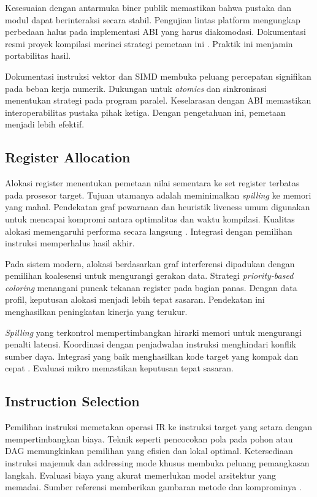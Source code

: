 \documentclass[../main.tex]{subfiles}
\begin{document}
Kesesuaian dengan antarmuka biner publik memastikan bahwa pustaka dan modul dapat berinteraksi secara stabil. Pengujian lintas platform mengungkap perbedaan halus pada implementasi ABI yang harus diakomodasi. Dokumentasi resmi proyek kompilasi merinci strategi pemetaan ini \citep{GCCInternals}. Praktik ini menjamin portabilitas hasil.

Dokumentasi instruksi vektor dan SIMD membuka peluang percepatan signifikan pada beban kerja numerik. Dukungan untuk \emph{atomics} dan sinkronisasi menentukan strategi pada program paralel. Keselarasan dengan ABI memastikan interoperabilitas pustaka pihak ketiga. Dengan pengetahuan ini, pemetaan menjadi lebih efektif.

\subsection{Register Allocation}
Alokasi register menentukan pemetaan nilai sementara ke set register terbatas pada prosesor target. Tujuan utamanya adalah meminimalkan \emph{spilling} ke memori yang mahal. Pendekatan graf pewarnaan dan heuristik liveness umum digunakan untuk mencapai kompromi antara optimalitas dan waktu kompilasi. Kualitas alokasi memengaruhi performa secara langsung \citep{WikiRegisterAllocation}. Integrasi dengan pemilihan instruksi memperhalus hasil akhir.

Pada sistem modern, alokasi berdasarkan graf interferensi dipadukan dengan pemilihan koalesensi untuk mengurangi gerakan data. Strategi \emph{priority-based coloring} menangani puncak tekanan register pada bagian panas. Dengan data profil, keputusan alokasi menjadi lebih tepat sasaran. Pendekatan ini menghasilkan peningkatan kinerja yang terukur.

\emph{Spilling} yang terkontrol mempertimbangkan hirarki memori untuk mengurangi penalti latensi. Koordinasi dengan penjadwalan instruksi menghindari konflik sumber daya. Integrasi yang baik menghasilkan kode target yang kompak dan cepat \citep{WikiRegisterAllocation}. Evaluasi mikro memastikan keputusan tepat sasaran.

\subsection{Instruction Selection}
Pemilihan instruksi memetakan operasi IR ke instruksi target yang setara dengan mempertimbangkan biaya. Teknik seperti pencocokan pola pada pohon atau DAG memungkinkan pemilihan yang efisien dan lokal optimal. Ketersediaan instruksi majemuk dan addressing mode khusus membuka peluang pemangkasan langkah. Evaluasi biaya yang akurat memerlukan model arsitektur yang memadai. Sumber referensi memberikan gambaran metode dan komprominya \citep{WikiInstructionSelection}.
\end{document}
